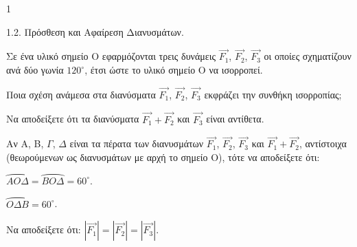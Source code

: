 \begin{ylh}{1}
    \item 1.2. Πρόσθεση και Αφαίρεση Διανυσμάτων.
\end{ylh}
\begin{figure}
\centering
{}
\end{figure}
Σε ένα υλικό σημείο O εφαρμόζονται τρεις δυνάμεις $\vec{F_1}$, $\vec{F_2}$, $\vec{F_3}$ οι οποίες σχηματίζουν ανά δύο γωνία $120^\circ$, έτσι ώστε το υλικό σημείο O να ισορροπεί.
\begin{alist}
\item Ποια σχέση ανάμεσα στα διανύσματα $\vec{F_1}$, $\vec{F_2}$, $\vec{F_3}$ εκφράζει την συνθήκη ισορροπίας; 
\item Να αποδείξετε ότι τα διανύσματα $\vec{F_1} + \vec{F_2}$ και $\vec{F_3}$ είναι αντίθετα. 
\item Αν A, B, $\Gamma$, $\Delta$ είναι τα πέρατα των διανυσμάτων $\vec{F_1}$, $\vec{F_2}$, $\vec{F_3}$ και $\vec{F_1} + \vec{F_2}$, αντίστοιχα (θεωρούμενων ως διανυσμάτων με αρχή το σημείο O), τότε να αποδείξετε ότι:
    \begin{rlist}
    \item $\wideparen{AO\Delta} = \wideparen{BO\Delta} = 60^\circ$. 
    \item $\wideparen{O\Delta B} = 60^\circ$. 
    \end{rlist}
\item Να αποδείξετε ότι: $|\vec{F_1}| = |\vec{F_2}| = |\vec{F_3}|$. 
\end{alist}
